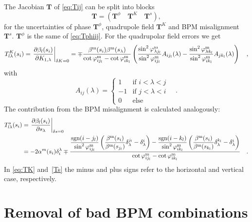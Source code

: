 The Jacobian $ \mathbf{T} $ of \eqref{eq:Tij} can be split into blocks 
%
\begin{equation}
\mathbf{T} = \left( \mathbf{T}^\phi \quad \mathbf{T}^K \quad \mathbf{T}^s\right),
\end{equation}
%
for the uncertainties of phase $ \mathbf{T}^\phi$, quadrupole field  $\mathbf{T}^K$ and BPM misalignment $\mathbf{T}^s$.
$ \mathbf{T}^\phi $ is the same of \eqref{eq:Tphiij}. For the quadrupolar field errors we get
%
\begin{align}
	T^K_{l\lambda}(s_i) = 
		\left. \frac{\partial \beta_l(s_i)}{\partial  K_{1,\lambda}}\right|_{\delta K = 0} =
		\mp\frac{\beta^\text{m}(s_i)\beta^\text{m}(s_\lambda)}{\cot\varphi_{ij_l}^\text{m} - \cot\varphi_{ik_l}^\text{m}}\left(
		\frac{\sin^2\varphi_{\lambda j_l}^\text{m}}{\sin^2\varphi_{ij_l}^\text{m}}A_{ij_l}(\lambda) - \frac{\sin^2\varphi_{\lambda k_l}^\text{m}}{\sin^2\varphi_{ik_l}^\text{m}}A_{jk_l}(\lambda)\right)\quad ,
\label{eq:TK}
\end{align}
%
  with 
%
\begin{equation}
    A_{ij}(\lambda) = \left\{\begin{array}{ll}
    1&\text{if }i<\lambda<j\\
    -1&\text{if }j<\lambda<i\\
    0&\text{else}
    \end{array}\right. \quad .
  \end{equation}
%
  The contribution from the BPM misalignment is calculated analogously:
%
\begin{align}
      T^s_{l\lambda}(s_i) &= \left.\frac{\partial \beta_l(s_i)}{\partial s_\lambda}\right|_{\delta s = 0} \notag \\
      &= -2\alpha^m(s_i)\delta_i^{\lambda}
      \mp 
      \frac{
          \dfrac{\text{sgn}(i-j_l)}{\sin^2 \varphi_{ij_l}^\text{m}}\left(\dfrac{\beta^\text{m}(s_i)}{\beta^\text{m}(s_{j_l})}\delta^{j_l}_\lambda - \delta_\lambda^i\right) -
          \dfrac{\text{sgn}(i-k_l)}{\sin^2 \varphi_{ik_l}^\text{m}}\left(\dfrac{\beta^\text{m}(s_i)}{\beta^\text{m}(s_{k_l})}\delta^{k_l}_\lambda - \delta_\lambda^i\right)}
      {\cot \varphi_{ij_l}^\text{m} - \cot \varphi_{ik_l}^\text{m}} \quad .
      \label{Ts}
  \end{align}
%
  In \eqref{eq:TK} and~\eqref{Ts} the minus and plus signs refer to the horizontal and vertical case, respectively. 

\section{Removal of bad BPM combinations}
\label{sec_bad_combs}


